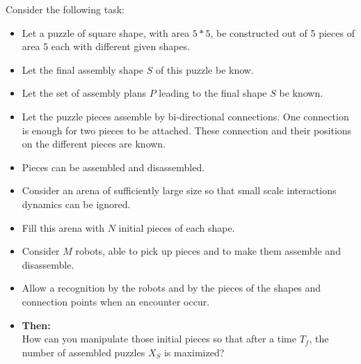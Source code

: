 \documentclass[letterpaper, oneside]{article}
\begin{document}
Consider the following task:
\begin{itemize}
	\item Let a puzzle of square shape, with area $5*5$, be constructed out of 5 pieces of area 5 each with different given shapes.
	\item Let the final assembly shape $S$ of this puzzle be know.
	\item Let the set of assembly plans $P$ leading to the final shape $S$ be known. 
	\item Let the puzzle pieces assemble by bi-directional connections. One connection is enough for two pieces to be attached. These connection and their positions on the different pieces are known.
	\item Pieces can be assembled and disassembled.
	\item Consider an arena of sufficiently large size so that small scale interactions dynamics can be ignored.
	\item Fill this arena with $N$ initial pieces of each shape.
	\item Consider $M$ robots, able to pick up pieces and to make them assemble and disassemble.
	\item Allow a recognition by the robots and by the pieces of the shapes and connection points when an encounter occur.
	\item \textbf{Then:}\\
	How can you manipulate those initial pieces so that after a time $T_f$, the number of assembled puzzles $X_S$ is maximized?
\end{itemize}
\end{document}
